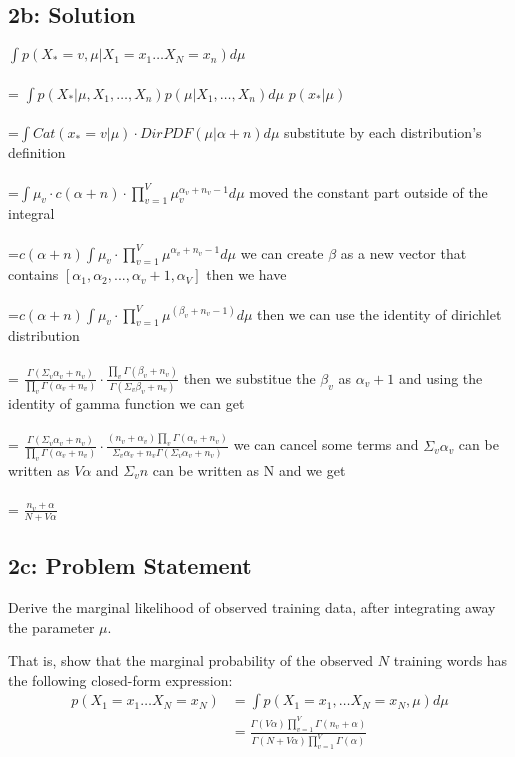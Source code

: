 \documentclass[10pt]{article}
\newcommand{\officialdirections}[1]{{\color{purple} #1}}
\begin{document}
\subsection{2b: Solution}
$\int p( X_* = v, \mu | X_1 = x_1 \ldots X_N = x_n) d\mu$ 
\\
\\
= $\int p(X_*|\mu, X_1,\ldots, X_n)p(\mu|X_1,\ldots, X_n)d\mu$  $p(x_*|\mu)$ 
\\
\\
=$\int Cat(x_*=v|\mu)\cdot DirPDF(\mu|\alpha + n)d\mu$ substitute by each distribution's definition
\\
\\
=$\int \mu_v \cdot c(\alpha + n) \cdot \prod_{v=1}^V\mu_v^{\alpha_v + n_v -1}d\mu$ moved the constant part outside of the integral
\\
\\
=$c(\alpha + n) \int \mu_v \cdot \prod_{v=1}^V \mu^{\alpha_v + n_v -1}d\mu$ we can create $\beta$ as a new vector that contains $[\alpha_1, \alpha_2, ..., \alpha_v + 1, \alpha_V]$ then we have 
\\
\\
=$c(\alpha + n)\int \mu_v \cdot \prod_{v=1}^V \mu ^ {(\beta_v + n_v -1)}d\mu$ then we can use the identity of dirichlet distribution
\\
\\
= $\frac {\Gamma(\Sigma_{v} \alpha_v + n_v)}{\prod_{v} \Gamma(\alpha_v+n_v)} \cdot \frac{\prod_{v} \Gamma(\beta_v+n_v)}{\Gamma(\Sigma_v \beta_v+n_v)}$ then we substitue the $\beta_v$ as $\alpha_v + 1$ and using the identity of gamma function we can get
\\
\\
= $\frac {\Gamma(\Sigma_{v} \alpha_v + n_v)}{\prod_{v} \Gamma(\alpha_v+n_v)} \cdot \frac{(n_v + \alpha_v)\prod_v\Gamma(\alpha_v+n_v)}{\Sigma_v \alpha_v + n_v \Gamma(\Sigma_v \alpha_v + n_v)}$ we can cancel some terms and $\Sigma_v \alpha_v$ can be written as $V\alpha$ and $\Sigma_v n$ can be written as N and we get
\\
\\
= $\frac{n_v + \alpha}{N + V\alpha}$


\officialdirections{
\subsection*{2c: Problem Statement}
Derive the marginal likelihood of observed training data, after integrating away the parameter $\mu$.

That is, show that the marginal probability of the observed $N$ training words has the following closed-form expression:
\begin{align}
p( X_1 = x_1 \ldots X_N = x_N) 
	&= \int p( X_1 = x_1, \ldots X_N = x_N, \mu ) d\mu
	\\
	&= \frac
	{ \Gamma(V \alpha)      \prod_{v=1}^V \Gamma( n_v + \alpha ) }
	{ \Gamma(N + V \alpha ) \prod_{v=1}^V \Gamma(\alpha)         }
\end{align}
}
\end{document}
